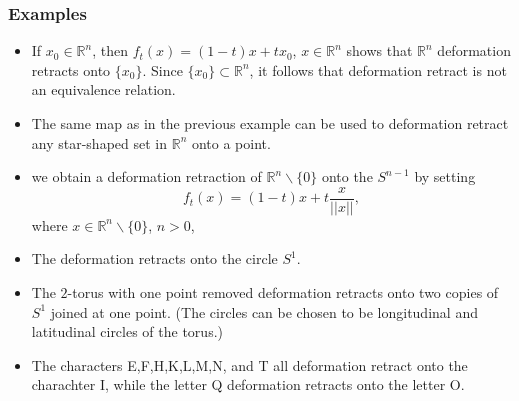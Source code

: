 \documentclass[12pt]{article}
\begin{document}
\subsubsection*{Examples}
\begin{itemize}
\item If $x_0\in \mathbb{R}^n$, then
$f_t(x)=(1-t)x+tx_0$, $x\in \mathbb{R}^n$  shows that $\mathbb{R}^n$ deformation retracts onto $\{x_0\}$.
 Since $\{x_0\} \subset \mathbb{R}^n$,
it follows that deformation retract is not an equivalence relation.
\item The same map as in the previous example can be used to deformation retract any star-shaped set in $\mathbb{R}^n$ onto a point.
\item we obtain a
deformation retraction of
$\mathbb{R}^n\backslash \{0\}$ onto the  $S^{n-1}$ by setting $$f_t(x)=(1-t)x+t \displaystyle{\frac{x}{||x||}},$$ where $x\in \mathbb{R}^n\backslash \{0\}$, $n>0$,  
\item The  deformation retracts onto the circle $S^1$.
\item The $2$-torus with one point removed deformation retracts onto
two copies of $S^1$ joined at one point. (The circles can be
chosen to be longitudinal and latitudinal circles of the torus.)
\item The characters E,F,H,K,L,M,N, and T all deformation retract onto the charachter I, while the letter Q deformation retracts onto the letter O.
\end{itemize}
\end{document}

